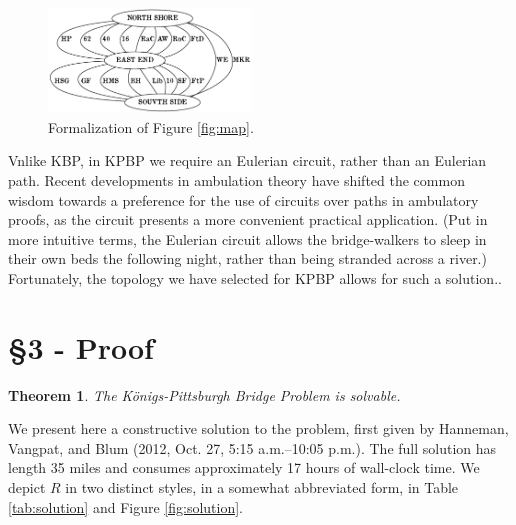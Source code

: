 \documentclass[twocolumn]{article}
\theoremstyle{plain}  %
\newtheorem{thm}{Theorem}
\theoremstyle{definition}  %
\theoremstyle{remark}  %
\begin{document}
\begin{figure}[t]
\centering
	\includegraphics[width=0.48\textwidth]{topology.pdf}
	\caption{Formalization of Figure \ref{fig:map}.}
	\label{fig:topo}
\end{figure}

Vnlike KBP, in KPBP we require an Eulerian circuit, rather than an Eulerian path.
Recent developments in ambulation theory have shifted the common wisdom towards a preference for the use of circuits over paths in ambulatory proofs, as the circuit presents a more convenient practical application. (Put in more intuitive terms, the Eulerian circuit allows the bridge-walkers to sleep in their own beds the following night, rather than being stranded across a river.) Fortunately, the topology we have selected for KPBP allows for such a solution..

\section*{\S 3 - Proof}

\begin{thm}
The K\"onigs-Pittsburgh Bridge Problem is solvable.
\end{thm}

We present here a constructive solution to the problem, first given by Hanneman, Vangpat, and Blum (2012, Oct. 27, 5:15 a.m.--10:05 p.m.).  The full solution has length 35 miles and consumes approximately 17 hours of wall-clock time. We depict $R$ in two distinct styles, in a somewhat abbreviated form, in Table \ref{tab:solution} and Figure \ref{fig:solution}.
\end{document}
